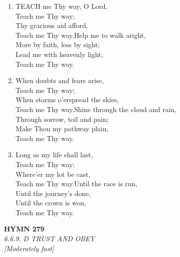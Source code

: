 \documentclass[11pt,a4paper]{article}
\begin{document}
\begin{enumerate}
    \item TEACH me Thy way, O Lord, \\
        Teach me Thy way; \\
        Thy gracious aid afford, \\
        Teach me Thy way.Help me to walk aright, \\
        More by faith, less by sight; \\
        Lead me with heavenly light, \\
        Teach me Thy way.

    \item When doubts and fears arise, \\
        Teach me Thy way; \\
        When storms o'erspread the skies, \\
        Teach me Thy way.Shine through the cloud and rain, \\
        Through sorrow, toil and pain; \\
        Make Thou my pathway plain, \\
        Teach me Thy way.

    \item Long as my life shall last, \\
        Teach me Thy way; \\
        Where'er my lot be cast, \\
        Teach me Thy way.Until the race is run, \\
        Until the journey's done, \\
        Until the crown is won, \\
        Teach me Thy way.

\end{enumerate}

\newpage
\begin{center}
    {\Large \textbf{HYMN 279}}
    \\
    \textit{6.6.9. D TRUST AND OBEY}
    \\
    \textit{\small [Moderately fast]}
\end{center}
\vspace{1em}
\end{document}
